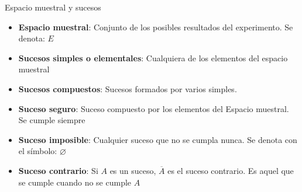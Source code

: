 \documentclass[11pt,handout]{beamer}
\begin{document}
\begin{frame}{Espacio muestral y sucesos}
\begin{itemize}[<+->]
\item \textbf{Espacio muestral}: Conjunto de los posibles resultados del experimento. Se denota: $E$
\item \textbf{Sucesos simples o elementales}: Cualquiera de los elementos del espacio muestral
\item \textbf{Sucesos compuestos}: Sucesos formados por varios simples. 
\item \textbf{Suceso seguro}: Suceso compuesto por los elementos del Espacio muestral. Se cumple siempre
\item \textbf{Suceso imposible}: Cualquier suceso que no se cumpla nunca. Se denota con el símbolo: $\varnothing$
\item \textbf{Suceso contrario}: Si $A$ es un suceso, $\overline{A}$ es el suceso contrario. Es aquel que se cumple cuando no se cumple $A$
\end{itemize}

\end{frame}
\end{document}

